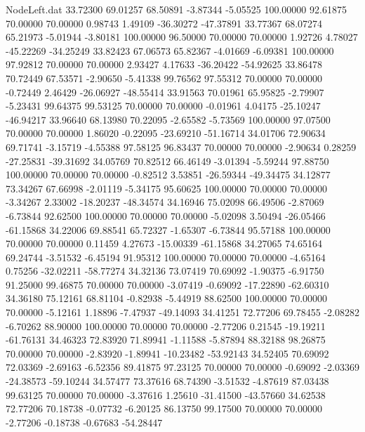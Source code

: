 \begin{filecontents}{NodeLeft.dat}
  33.72300   69.01257   68.50891    -3.87344   -5.05525  100.00000   92.61875   70.00000   70.00000    0.98743    1.49109  -36.30272  -47.37891
  33.77367   68.07274   65.21973    -5.01944   -3.80181  100.00000   96.50000   70.00000   70.00000    1.92726    4.78027  -45.22269  -34.25249
  33.82423   67.06573   65.82367    -4.01669   -6.09381  100.00000   97.92812   70.00000   70.00000    2.93427    4.17633  -36.20422  -54.92625
  33.86478   70.72449   67.53571    -2.90650   -5.41338   99.76562   97.55312   70.00000   70.00000   -0.72449    2.46429  -26.06927  -48.55414
  33.91563   70.01961   65.95825    -2.79907   -5.23431   99.64375   99.53125   70.00000   70.00000   -0.01961    4.04175  -25.10247  -46.94217
  33.96640   68.13980   70.22095    -2.65582   -5.73569  100.00000   97.07500   70.00000   70.00000    1.86020   -0.22095  -23.69210  -51.16714
  34.01706   72.90634   69.71741    -3.15719   -4.55388   97.58125   96.83437   70.00000   70.00000   -2.90634    0.28259  -27.25831  -39.31692
  34.05769   70.82512   66.46149    -3.01394   -5.59244   97.88750  100.00000   70.00000   70.00000   -0.82512    3.53851  -26.59344  -49.34475
  34.12877   73.34267   67.66998    -2.01119   -5.34175   95.60625  100.00000   70.00000   70.00000   -3.34267    2.33002  -18.20237  -48.34574
  34.16946   75.02098   66.49506    -2.87069   -6.73844   92.62500  100.00000   70.00000   70.00000   -5.02098    3.50494  -26.05466  -61.15868
  34.22006   69.88541   65.72327    -1.65307   -6.73844   95.57188  100.00000   70.00000   70.00000    0.11459    4.27673  -15.00339  -61.15868
  34.27065   74.65164   69.24744    -3.51532   -6.45194   91.95312  100.00000   70.00000   70.00000   -4.65164    0.75256  -32.02211  -58.77274
  34.32136   73.07419   70.69092    -1.90375   -6.91750   91.25000   99.46875   70.00000   70.00000   -3.07419   -0.69092  -17.22890  -62.60310
  34.36180   75.12161   68.81104    -0.82938   -5.44919   88.62500  100.00000   70.00000   70.00000   -5.12161    1.18896   -7.47937  -49.14093
  34.41251   72.77206   69.78455    -2.08282   -6.70262   88.90000  100.00000   70.00000   70.00000   -2.77206    0.21545  -19.19211  -61.76131
  34.46323   72.83920   71.89941    -1.11588   -5.87894   88.32188   98.26875   70.00000   70.00000   -2.83920   -1.89941  -10.23482  -53.92143
  34.52405   70.69092   72.03369    -2.69163   -6.52356   89.41875   97.23125   70.00000   70.00000   -0.69092   -2.03369  -24.38573  -59.10244
  34.57477   73.37616   68.74390    -3.51532   -4.87619   87.03438   99.63125   70.00000   70.00000   -3.37616    1.25610  -31.41500  -43.57660
  34.62538   72.77206   70.18738    -0.07732   -6.20125   86.13750   99.17500   70.00000   70.00000   -2.77206   -0.18738   -0.67683  -54.28447

\end{filecontents}
